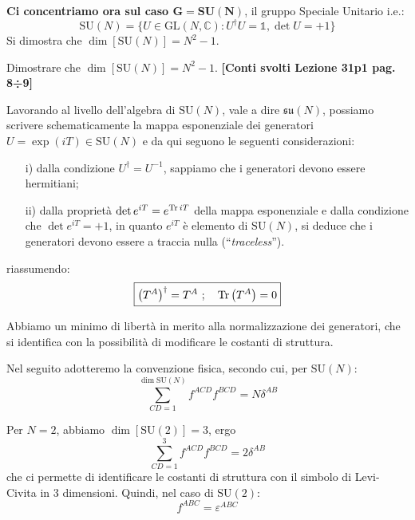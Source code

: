 \documentclass[../main.tex]{subfiles}
\begin{document}
\textbf{Ci concentriamo ora sul caso $\mathbf{G=\textrm{SU}(N)}$}, il gruppo Speciale Unitario i.e.:
\[\textrm{SU}(N) = \Big\{ U\in\textrm{GL}(N,\mathbb C) : U^\dagger U=\mathbb 1, \det U = +1 \Big\}\]
Si dimostra che $\dim[\textrm{SU}(N)] = N^2-1$.
\begin{exercise}
    Dimostrare che $\dim[\textrm{SU}(N)] = N^2-1$. \textbf{[Conti svolti Lezione 31p1 pag. 8÷9]}
\end{exercise}
Lavorando al livello dell'algebra di $\textrm{SU}(N)$, vale a dire $\mathfrak{su}(N)$, possiamo scrivere schematicamente la mappa esponenziale dei generatori $U=\exp(iT)\in\textrm{SU}(N)$ e da qui seguono le seguenti considerazioni:
\begin{enumerate}
    \item [i)] dalla condizione $U^\dagger=U^{-1}$, sappiamo che i generatori devono essere hermitiani;
    \item [ii)] dalla proprietà $\det e^{iT}=e^{\Tr iT}$ della mappa esponenziale e dalla condizione che $\det e^{iT}=+1$, in quanto $e^{iT}$ è elemento di $\textrm{SU}(N)$, si deduce che i generatori devono essere a traccia nulla (“\textit{traceless}”).
\end{enumerate}
riassumendo:
\[
\boxed{
\big(T^A\big)^\dagger=T^A~;\quad \Tr \big(T^A\big) = 0
}
\]
\begin{nota}
    Abbiamo un minimo di libertà in merito alla normalizzazione dei generatori, che si identifica con la possibilità di modificare le costanti di struttura.

    Nel seguito adotteremo la convenzione fisica, secondo cui, per $\textrm{SU}(N)$:
    \[
    \sum_{CD=1}^{\dim\textrm{SU}(N)}f^{ACD}f^{BCD} = N\delta^{AB}
    \]
\end{nota}
\begin{example}
    Per $N=2$, abbiamo $\dim[\textrm{SU}(2)] = 3$, ergo
    \[
    \sum_{CD=1}^{3}f^{ACD}f^{BCD} = 2\delta^{AB}
    \]
    che ci permette di identificare le costanti di struttura con il simbolo di Levi-Civita in 3 dimensioni. Quindi, nel caso di $\textrm{SU}(2)$: 
    \[
    f^{ABC} = \varepsilon^{ABC}
    \]
\end{example}
\end{document}
